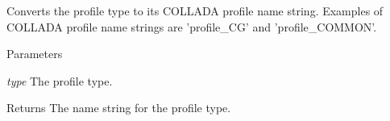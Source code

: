 \label{namespaceFUDaeProfileType_ac07bd1059bb338bf6a10e422c7e9e057}
Converts the profile type to its COLLADA profile name string. Examples of COLLADA profile name strings are 'profile\_\-CG' and 'profile\_\-COMMON'. 
\begin{DoxyParams}{Parameters}
\item[{\em type}]The profile type. \end{DoxyParams}
\begin{DoxyReturn}{Returns}
The name string for the profile type. 
\end{DoxyReturn}

